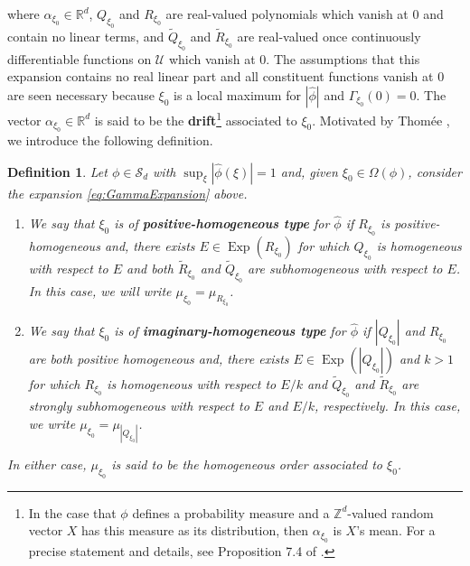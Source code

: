 \documentclass[11pt]{article}
\newtheorem{definition}[theorem]{Definition}
\theoremstyle{remark}
\newcommand\Exp{\operatorname{Exp}}
\begin{document}
where $\alpha_{\xi_0}\in\mathbb{R}^d$, $Q_{\xi_0}$ and $R_{\xi_0}$ are real-valued polynomials which vanish at $0$ and contain no linear terms, and $\widetilde{Q}_{\xi_0}$ and $\widetilde{R}_{\xi_0}$ are real-valued once continuously differentiable functions on $\mathcal{U}$ which vanish at $0$. The assumptions that this expansion contains no real linear part and all constituent functions vanish at $0$ are seen necessary because $\xi_0$ is a local maximum for $|\widehat{\phi}|$ and $\Gamma_{\xi_0}(0)=0$. The vector $\alpha_{\xi_0}\in\mathbb{R}^d$ is said to be the \textbf{drift}\footnote{In the case that $\phi$ defines a probability measure and a $\mathbb{Z}^d$-valued random vector $X$ has this measure as its distribution, then $\alpha_{\xi_0}$ is $X$'s mean. For a precise statement and details, see Proposition 7.4 of \cite{Randles2017}.} associated to $\xi_0$. Motivated by Thom\'{e}e \cite{Thomee1965}, we introduce the following definition. 
\begin{definition}\label{def:Types}
Let $\phi\in\mathcal{S}_d$ with $\sup_{\xi}|\widehat{\phi}(\xi)|=1$ and, given $\xi_0\in\Omega(\phi)$, consider the expansion \eqref{eq:GammaExpansion} above.
\begin{enumerate}
    \item We say that $\xi_0$ is of \textbf{positive-homogeneous type} for $\widehat{\phi}$ if $R_{\xi_0}$ is positive-homogeneous and, there exists $E\in \Exp(R_{\xi_0})$ for which $Q_{\xi_0}$ is homogeneous with respect to $E$ and both $\widetilde{R}_{\xi_0}$ and $\widetilde{Q}_{\xi_0}$ are subhomogeneous with respect to $E$. In this case, we will write  $\mu_{\xi_0}=\mu_{R_{\xi_0}}$.
\item We say that $\xi_0$ is of \textbf{imaginary-homogeneous type} for $\widehat{\phi}$ if $|Q_{\xi_0}|$ and $R_{\xi_0}$ are both positive homogeneous and, there exists $E\in\Exp(|Q_{\xi_0}|)$ and $k>1$ for which $R_{\xi_0}$ is homogeneous with respect to $E/k$ and $\widetilde{Q}_{\xi_0}$ and $\widetilde{R}_{\xi_0}$ are strongly subhomogeneous with respect to $E$ and $E/k$, respectively. In this case, we write $\mu_{\xi_0}=\mu_{|Q_{\xi_0}|}$.
\end{enumerate}
In either case, $\mu_{\xi_0}$ is said to be the homogeneous order associated to $\xi_0$.
\end{definition}
\end{document}
